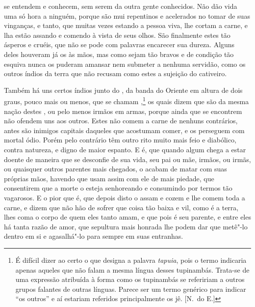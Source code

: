 se entendem e conhecem, sem serem da outra gente conhecidos. Não dão
vida uma só hora a ninguém, porque são mui repentinos e acelerados no
tomar de suas vinganças, e tanto, que muitas vezes estando a pessoa
viva, lhe cortam a carne, e lha estão assando e comendo à vista de seus \EP[1]
olhos. São finalmente estes  tão ásperos e cruéis, que não se
pode com palavras encarecer sua dureza. Alguns deles houveram já os			%
 às mãos, mas como sejam tão bravos e de condição tão
esquiva nunca os puderam amansar nem submeter a nenhuma servidão, como os		
outros índios da terra que não recusam como estes a sujeição do cativeiro.

Também há uns certos índios junto do , da banda do		%
Oriente em altura de dois graus, pouco mais ou menos, que se chamam
,\footnote{É difícil dizer ao certo o que designa a palavra \textit{tapuia},  
pois o termo indicaria apenas aqueles que não falam a mesma língua desses tupinambás. Trata-se de uma
expressão atribuída à forma como os tupinambás se refeririam a outros
grupos falantes de outras línguas. Parece ser um termo genérico para
indicar ``os outros'' e aí estariam referidos principalmente os jê. [N.~do E.]}  
os quais dizem que são da mesma nação destes , ou pelo %
menos irmãos em armas, porque ainda que se encontrem não ofendem uns			%
aos outros. Estes  não comem a carne de nenhuns contrários, 
antes são inimigos capitais daqueles que acostumam comer, e os
perseguem com mortal ódio. Porém pelo contrário têm outro rito muito
mais feio e diabólico, contra natureza, e digno de maior espanto. E é,
que quando algum chega a estar doente de maneira que se desconfie de
sua vida, seu pai ou mãe, irmãos, ou irmãs, ou quaisquer outros
parentes mais chegados, o acabam de matar com suas próprias mãos,			%
havendo que usam assim com ele de mais piedade, que consentirem que a
morte o esteja senhoreando e consumindo por termos tão vagarosos. E o
pior que é, que depois disto o assam e cozem e lhe comem toda a carne,
e dizem que não hão de sofrer que coisa tão baixa e vil, como é a
terra, lhes coma o corpo de quem eles tanto amam, e que pois é seu
parente, e entre eles há tanta razão de amor, que sepultura mais
honrada lhe podem dar que metê"-lo dentro em si e agasalhá"-lo para			%
sempre em suas entranhas.

